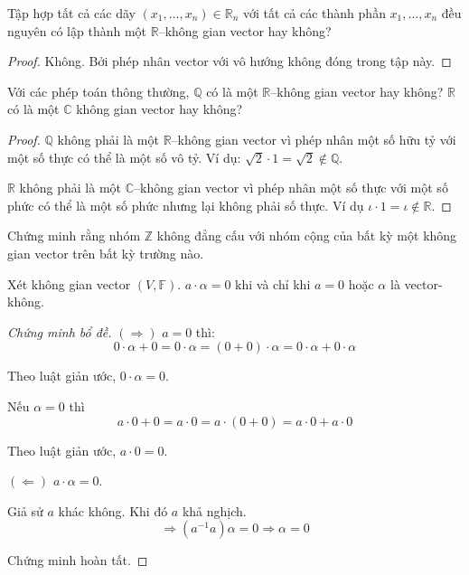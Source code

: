 \documentclass[class=linear-algebra,crop=false]{standalone}
\begin{document}
\begin{exercise}Tập hợp tất cả các dãy $(x_{1},\ldots, x_{n})\in\mathbb{R}_{n}$ với tất cả các thành phần $x_{1}, \ldots, x_{n}$ đều nguyên có lập thành một $\mathbb{R}$--không gian vector hay không?
\end{exercise}

\begin{proof}Không. Bởi phép nhân vector với vô hướng không đóng trong tập này.
\end{proof}

\begin{exercise}Với các phép toán thông thường, $\mathbb{Q}$ có là một $\mathbb{R}$--không gian vector hay không? $\mathbb{R}$ có là một $\mathbb{C}$ không gian vector hay không?
\end{exercise}

\begin{proof}$\mathbb{Q}$ không phải là một $\mathbb{R}$--không gian vector vì phép nhân một số hữu tỷ với một số thực có thể là một số vô tỷ. Ví dụ: $\sqrt{2}\cdot 1 = \sqrt{2}\not\in\mathbb{Q}$.
    \par $\mathbb{R}$ không phải là một $\mathbb{C}$--không gian vector vì phép nhân một số thực với một số phức có thể là một số phức nhưng lại không phải số thực. Ví dụ $\iota\cdot 1 = \iota\not\in\mathbb{R}$.
\end{proof}

\begin{exercise}Chứng minh rằng nhóm $\mathbb{Z}$ không đẳng cấu với nhóm cộng của bất kỳ một không gian vector trên bất kỳ trường nào.
\end{exercise}

\begin{lemma}Xét không gian vector $(V, \mathbb{F})$. $a\cdot\alpha = 0$ khi và chỉ khi $a = 0$ hoặc $\alpha$ là vector-không.
\end{lemma}

\begin{proof}[Chứng minh bổ đề]$(\Rightarrow)$ $a = 0$ thì:
    \[ 0\cdot\alpha + 0 = 0\cdot\alpha = (0 + 0)\cdot\alpha = 0\cdot\alpha + 0\cdot\alpha \]
    \par Theo luật giản ước, $0\cdot\alpha = 0$.
    \par Nếu $\alpha = 0$ thì
    \[ a\cdot 0 + 0 = a\cdot 0 = a\cdot (0 + 0) = a\cdot 0 + a\cdot 0 \]
    \par Theo luật giản ước, $a\cdot 0 = 0$.
    \bigskip
    \par $(\Leftarrow)$ $a\cdot\alpha = 0$.
    \par Giả sử $a$ khác không. Khi đó $a$ khả nghịch.
    \[ \Rightarrow (a^{-1}a)\alpha = 0 \Rightarrow \alpha = 0\]
    \par Chứng minh hoàn tất.
\end{proof}
\end{document}
